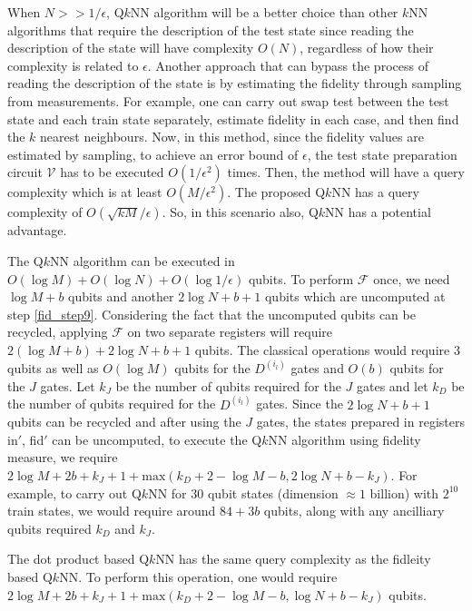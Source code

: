 \documentclass[a4paper,twocolumn,11pt,unpublished]{quantumarticle}
\begin{document}
     When $ N >> 1/ \epsilon$, Q$k$NN algorithm will be a better choice than other $k$NN algorithms that require the description of the test state since reading the description of the state will have complexity $O(N)$, regardless of how their complexity is related to $\epsilon$. Another approach that can bypass the process of reading the description of the state is by estimating the fidelity through sampling from measurements. For example, one can carry out swap test between the test state and each train state separately, estimate fidelity in each case, and then find the $k$ nearest neighbours. Now, in this method, since the fidelity values are estimated by sampling, to achieve an error bound of $\epsilon $, the test state preparation circuit $\mathcal V$ has to be executed $O({1 / \epsilon ^ 2})$ times. Then, the method will have a query complexity which is at least $O(M/ \epsilon^2)$. The proposed Q$k$NN has a query complexity of $O(\sqrt{kM} / \epsilon)$. So, in this scenario also, Q$k$NN has a potential advantage. 
    
    The Q$k$NN algorithm can be executed in $O(\log M) + O(\log N) + O(\log 1/ \epsilon)$ qubits. To perform $\mathcal{F}$ once, we need $\log M + b$ qubits and another $2\log N + b + 1$ qubits which are uncomputed at step \ref{fid_step9}. Considering the fact that the uncomputed qubits can be recycled, applying $\mathcal{F}$ on two separate registers will require $2(\log M + b) + 2\log N + b + 1$ qubits. The classical operations would require $3$ qubits as well as $ O(\log M) $ qubits for the $D ^ {(i_l)}$ gates and $ O(b)$ qubits for the $J$ gates. Let $k_J$ be the number of qubits required for the $J$ gates and let $k_D$ be the number of qubits required for the $D ^ {(i_l)}$ gates. Since the $2\log N + b + 1$ qubits can be recycled and after using the $J$ gates, the states prepared in registers in$'$, fid$'$ can be uncomputed, to execute the Q$k$NN algorithm using fidelity measure, we require $ 2 \log M + 2b + k_J + 1 + \text{max}(k_D + 2 - \log M - b, 2 \log N + b - k_J)$. For example, to carry out Q$k$NN for $30$ qubit states (dimension $\approx 1$ billion) with $2 ^ {10}$ train states, we would require around $84 + 3b$ qubits, along with any ancilliary qubits required $k_D$ and $k_J$.
    
    The dot product based  Q$k$NN has the same query complexity as the fidleity based  Q$k$NN. To perform this operation, one would require $ 2 \log M + 2b + k_J + 1 + \text{max}(k_D + 2 - \log M - b, \log N + b - k_J)$ qubits.
\end{document}
